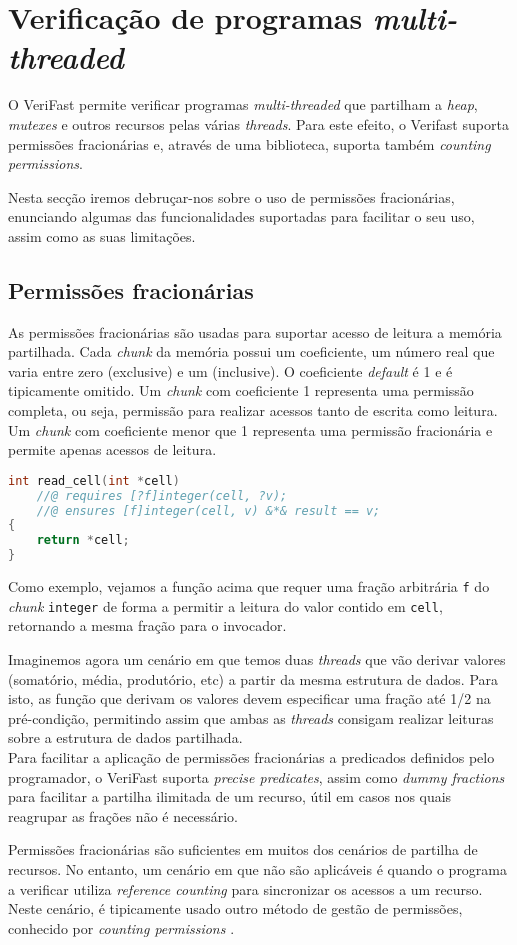 \section{Verificação de programas \textit{multi-threaded}}

O VeriFast permite verificar programas \textit{multi-threaded} que partilham a \textit{heap}, \textit{mutexes} e outros recursos pelas várias \textit{threads}. Para este efeito, o Verifast suporta permissões fracionárias e, através de uma biblioteca, suporta também \textit{counting permissions}.

Nesta secção iremos debruçar-nos sobre o uso de permissões fracionárias, enunciando algumas das funcionalidades suportadas para facilitar o seu uso, assim como as suas limitações.

\subsection{Permissões fracionárias}

As permissões fracionárias são usadas para suportar acesso de leitura a memória partilhada. Cada \textit{chunk} da memória possui um coeficiente, um número real que varia entre zero (exclusive) e um (inclusive). O coeficiente \textit{default} é 1 e é tipicamente omitido. Um \textit{chunk} com coeficiente 1 representa uma permissão completa, ou seja, permissão para realizar acessos tanto de escrita como leitura. Um \textit{chunk} com coeficiente menor que 1 representa uma permissão fracionária e permite apenas acessos de leitura.

\begin{lstlisting}[language=C]
int read_cell(int *cell)
    //@ requires [?f]integer(cell, ?v);
    //@ ensures [f]integer(cell, v) &*& result == v;
{
    return *cell;
}
\end{lstlisting}

Como exemplo, vejamos a função acima que requer uma fração arbitrária \texttt{f} do \textit{chunk} \texttt{integer} de forma a permitir a leitura do valor contido em \texttt{cell}, retornando a mesma fração para o invocador.

Imaginemos agora um cenário em que temos duas \textit{threads} que vão derivar valores (somatório, média, produtório, etc) a partir da mesma estrutura de dados. Para isto, as função que derivam os valores devem especificar uma fração até 1/2 na pré-condição, permitindo assim que ambas as \textit{threads} consigam realizar leituras sobre a estrutura de dados partilhada. \\

Para facilitar a aplicação de permissões fracionárias a predicados definidos pelo programador, o VeriFast suporta \textit{precise predicates}, assim como \textit{dummy fractions} para facilitar a partilha ilimitada de um recurso, útil em casos nos quais reagrupar as frações não é necessário.

Permissões fracionárias são suficientes em muitos dos cenários de partilha de recursos. No entanto, um cenário em que não são aplicáveis é quando o programa a verificar utiliza \textit{reference counting} para sincronizar os acessos a um recurso. Neste cenário, é tipicamente usado outro método de gestão de permissões, conhecido por \textit{counting permissions} \cite{symbolic}.
